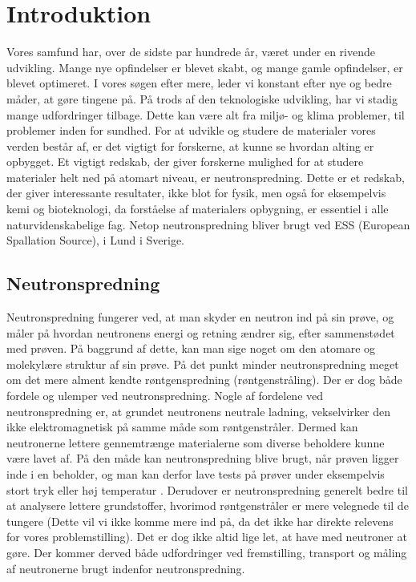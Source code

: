 \documentclass[12pt,oneside,a4paper]{article}
\begin{document}
{{{{{%
\newpage

\tableofcontents

\newpage


\section{Introduktion}

Vores samfund har, over de sidste par hundrede år, været under en rivende udvikling. Mange nye opfindelser er blevet skabt, og mange gamle opfindelser, er blevet optimeret. I vores søgen efter mere, leder vi konstant efter nye og bedre måder, at gøre tingene på. På trods af den teknologiske udvikling, har vi stadig mange udfordringer tilbage. Dette kan være alt fra miljø- og klima problemer, til problemer inden for sundhed. For at udvikle og studere de materialer vores verden består af, er det vigtigt for forskerne, at kunne se hvordan alting er opbygget. Et vigtigt redskab, der giver forskerne mulighed for at studere materialer helt ned på atomart niveau, er neutronspredning. Dette er et redskab, der giver interessante resultater, ikke blot for fysik, men også for eksempelvis kemi og bioteknologi, da forståelse af materialers opbygning, er essentiel i alle naturvidenskabelige fag. Netop neutronspredning bliver brugt ved ESS (European Spallation Source), i Lund i Sverige. \cite{ess_folder}

\subsection{Neutronspredning}
Neutronspredning fungerer ved, at man skyder en neutron ind på sin prøve, og måler på hvordan neutronens energi og retning ændrer sig, efter sammenstødet med prøven. På baggrund af dette, kan man sige noget om den atomare og molekylære struktur af sin prøve. På det punkt minder neutronspredning meget om det mere alment kendte røntgenspredning (røntgenstråling). Der er dog både fordele og ulemper ved neutronspredning. Nogle af fordelene ved neutronspredning er, at grundet neutronens neutrale ladning, vekselvirker den ikke elektromagnetisk på samme måde som røntgenstråler. Dermed kan neutronerne lettere gennemtrænge materialerne som diverse beholdere kunne være lavet af. På den måde kan neutronspredning blive brugt, når prøven ligger inde i en beholder, og man kan derfor lave tests på prøver under eksempelvis stort tryk eller høj temperatur . Derudover er neutronspredning generelt bedre til at analysere lettere grundstoffer, hvorimod røntgenstråler er mere velegnede til de tungere (Dette vil vi ikke komme mere ind på, da det ikke har direkte relevens for vores problemstilling). Det er dog ikke altid lige let, at have med neutroner at gøre. Der kommer derved både udfordringer ved fremstilling, transport og måling af neutronerne brugt indenfor neutronspredning.

}}}}}
\end{document}
